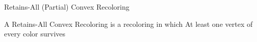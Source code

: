 \begin{frame}{Retains-All (Partial) Convex Recoloring}

\begin{definition}
A \alert{Retains-All Convex Recoloring} 
is a recoloring in which At least one vertex of every color survives 
\end{definition}

\end{frame}
